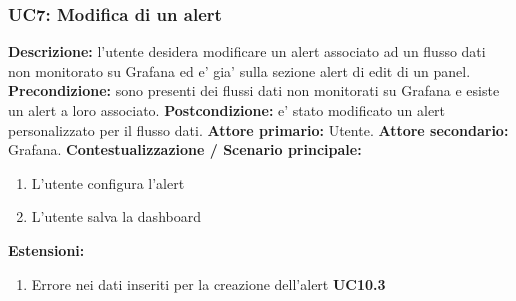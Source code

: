                 \subsubsection{UC7: Modifica di un alert}
                    \textbf{Descrizione:} l’utente desidera modificare un alert associato ad un flusso dati non monitorato su Grafana ed e’ gia’ sulla sezione alert di edit di un panel.
                    \newline
                    \textbf{Precondizione:} sono presenti dei flussi dati non monitorati su Grafana e esiste un alert a loro associato.
                    \newline
                    \textbf{Postcondizione:} e’ stato modificato un alert personalizzato per il flusso dati.
                    \newline
                    \textbf{Attore primario:} Utente.
                    \newline
                    \textbf{Attore secondario:} Grafana.
                    \newline
                    \textbf{Contestualizzazione / Scenario principale:} \begin{enumerate}
                            \item L’utente configura l’alert 
                            \item L’utente salva la dashboard
                        \end{enumerate}
                    
                    \textbf{Estensioni:} 
                    \begin{enumerate}
                            \item Errore nei dati inseriti per la creazione dell'alert \textbf{UC10.3}
                        \end{enumerate}
                        
